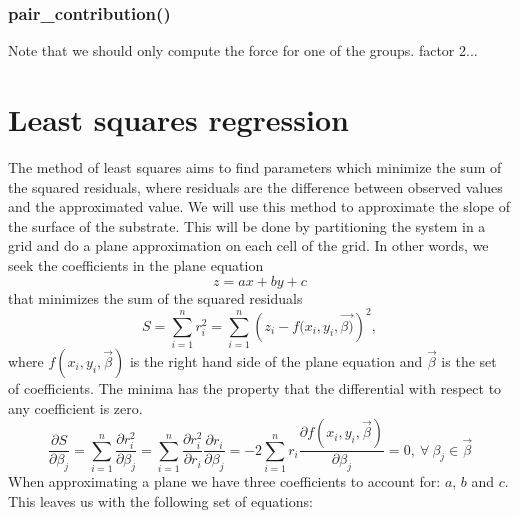 \documentclass[twoside,english]{uiofysmaster}
\newcommand\lr[1]{\left(#1\right)}
\begin{document}
\subsubsection{pair\_contribution()}



{\color{editColor}Note that we should only compute the force for one of the groups. factor 2...}
\newpage
\section{Least squares regression}
The method of least squares aims to find parameters which  minimize the sum of the squared residuals, where residuals are the difference between observed values and the approximated value. We will use this method to approximate the slope of the surface of the substrate. This will be done by partitioning the system in a grid and do a plane approximation on each cell of the grid. In other words, we seek the coefficients in the plane equation
\begin{equation}
	z = ax + by + c
	\label{planeEquation}
\end{equation}
that minimizes the sum of the squared residuals
\begin{equation}
	S = \sum_{i=1}^{n} r_i^2 = \sum_{i=1}^{n} \lr{z_i - f(x_i, y_i, \vec{\beta)}}^2,
	\label{leastSquaresPlane}
\end{equation}
where $f(x_i,y_i,\vec{\beta})$ is the right hand side of the plane equation and $\vec{\beta}$ is the set of coefficients.
The minima has the property that the differential with respect to any coefficient is zero. 
\begin{equation}
	\frac{\partial S}{\partial \beta_j} 
	=  \sum_{i=1}^{n}\frac{\partial r_i^2}{\partial \beta_j} 
	=  \sum_{i=1}^{n}\frac{\partial r_i^2}{\partial r_i} \frac{\partial r_i}{\partial \beta_j} 
	= -2 \sum_{i=1}^{n}r_i\frac{\partial f(x_i,y_i, \vec{\beta})}{\partial \beta_j}
	= 0 , ~\forall ~\beta_j \in \vec{\beta}
\end{equation}
When approximating a plane we have three coefficients to account for: $a$, $b$ and $c$. This leaves us with the following set of equations:
\end{document}
